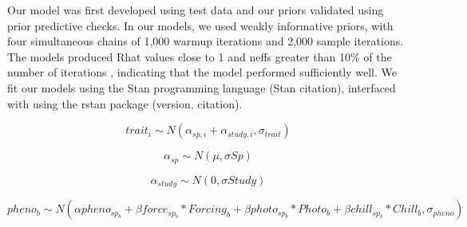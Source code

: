 \documentclass{article}\usepackage[]{graphicx}\usepackage[]{color}
\begin{document}
Our model was first developed using test data and our priors validated using prior predictive checks. In our models, we used weakly informative priors, with four simultaneous chains of 1,000 warmup iterations and 2,000 sample iterations. The models produced Rhat values close to 1 and neffs greater than 10\% of the number of iterations %
, indicating that the model performed sufficiently well.  We fit our models using the Stan programming language (Stan citation), interfaced with using the rstan package (version, citation).


 

\begin{equation}
\label{TraitsLine_main}
trait_{i} \sim N( \alpha_{sp,i} + \alpha_{study,i},\sigma_{trait}) 
\end{equation}

\begin{equation}
\label{TraitsLine_sp}
\alpha_{sp} \sim N(\mu, \sigma Sp)
\end{equation}

\begin{equation}
\label{TraitsLine_study}
\alpha_{study} \sim N(0, \sigma Study)
\end{equation} 

\begin{equation}
\label{phen_main}
pheno_{b}  \sim N( \alpha pheno_{sp_b} + \beta force_{sp_b} * Forcing_{b} + \beta photo_{sp_b}  * Photo_{b} + \beta chill_{sp_b} * Chill_{b} , \sigma_{pheno} ) 
\end{equation} 
\end{document}
